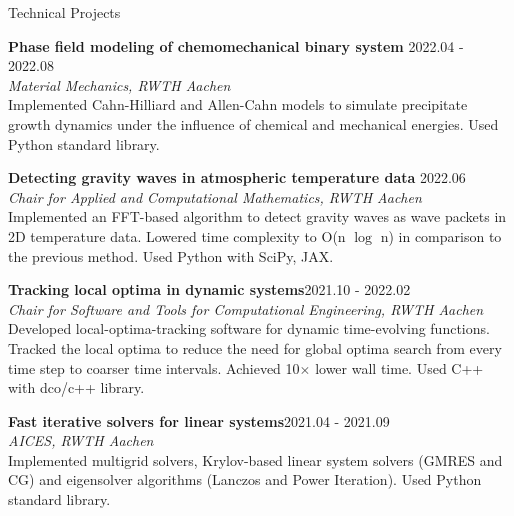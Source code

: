 \documentclass{cv}
\begin{document}
  
  
  \newpage
  \begin{rSection}{Technical Projects}
    \item {\bf Phase field modeling of chemomechanical binary system} \hfill {2022.04 - 2022.08}\\
    {\em Material Mechanics, RWTH Aachen}\\
    Implemented Cahn-Hilliard and Allen-Cahn models to simulate precipitate growth dynamics under the influence of chemical and mechanical energies. 
    Used Python standard library.
    
    \item {\bf Detecting gravity waves in atmospheric temperature data} \hfill {2022.06}\\
    {\em Chair for Applied and Computational Mathematics, RWTH Aachen}\\
    Implemented an FFT-based algorithm to detect gravity waves as wave packets in 2D temperature data. 
    Lowered time complexity to O(n $\log$ n) in comparison to the previous method.
    Used Python with SciPy, JAX.
    
    \item {\bf Tracking local optima in dynamic systems}\hfill {2021.10 - 2022.02}\\
    {\em Chair for Software and Tools for Computational Engineering, RWTH Aachen}\\
    Developed local-optima-tracking software for dynamic time-evolving functions. 
    Tracked the local optima to reduce the need for global optima search from every time step to coarser time intervals. Achieved 10$\times$ lower wall time.
    Used C++ with dco/c++ library.
    
    \item {\bf Fast iterative solvers for linear systems}\hfill {2021.04 - 2021.09}\\
    {\em AICES, RWTH Aachen}\\
    Implemented multigrid solvers, Krylov-based linear system solvers (GMRES and CG) and eigensolver algorithms (Lanczos and Power Iteration). 
    Used Python standard library.
    
    
  \end{rSection}
  
\end{document}
